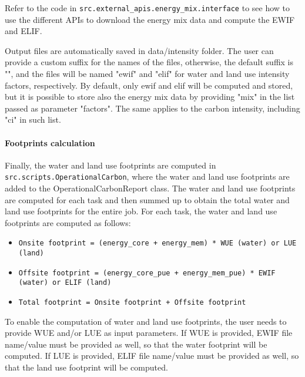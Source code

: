 \documentclass{article}
\begin{document}
Refer to the code in \verb|src.external_apis.energy_mix.interface| to see how to use the different APIs to download the energy mix data and compute the EWIF and ELIF.

Output files are automatically saved in data/intensity folder. The user can provide a custom suffix for the names of the files, otherwise, the default suffix is "", and the files will be named "ewif" and "elif" for water and land use intensity factors, respectively. By default, only ewif and elif will be computed and stored, but it is possible to store also the energy mix data by providing "mix" in the list passed as parameter "factors". The same applies to the carbon intensity, including "ci" in such list.

\paragraph{Footprints calculation}
Finally, the water and land use footprints are computed in \verb|src.scripts.OperationalCarbon|, where the water and land use footprints are added to the OperationalCarbonReport class. The water and land use footprints are computed for each task and then summed up to obtain the total water and land use footprints for the entire job. 
For each task, the water and land use footprints are computed as follows:
\begin{itemize}
    \item \verb|Onsite footprint = (energy_core + energy_mem) * WUE (water) or LUE (land)|
    \item \verb|Offsite footprint = (energy_core_pue + energy_mem_pue) * EWIF (water) or ELIF (land)|
    \item \verb|Total footprint = Onsite footprint + Offsite footprint|
\end{itemize}

To enable the computation of water and land use footprints, the user needs to provide WUE and/or LUE as input parameters. If WUE is provided, EWIF file name/value must be provided as well, so that the water footprint will be computed. If LUE is provided, ELIF file name/value must be provided as well, so that the land use footprint will be computed. 
\end{document}

